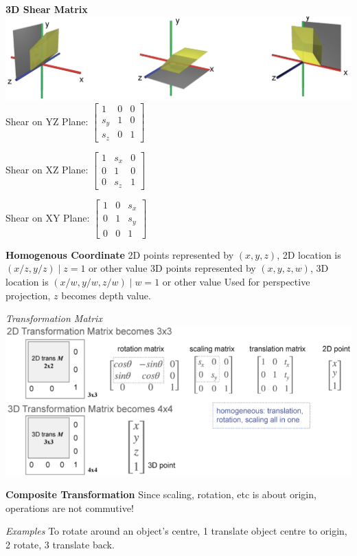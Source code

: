 \documentclass[letterpaper, 8pt]{extarticle}
\begin{document}
\begin{multicols*}{4}
\textbf{3D Shear Matrix}
\includegraphics[width=\linewidth]{3d-shear.png}
Shear on YZ Plane:
\(
\begin{bmatrix}
    1 & 0 & 0 \\
    s_y & 1 & 0 \\
    s_z & 0 & 1
\end{bmatrix}
\)

Shear on XZ Plane:
\(
\begin{bmatrix}
    1 & s_x & 0 \\
    0 & 1 & 0 \\
    0 & s_z & 1
\end{bmatrix}
\)

Shear on XY Plane:
\(
\begin{bmatrix}
    1 & 0 & s_x \\
    0 & 1 & s_y \\
    0 & 0 & 1
\end{bmatrix}
\)

\textbf{Homogenous Coordinate}
2D points represented by \((x, y, z)\), 2D location is \((x/z, y/z) \mid z=1\) or other value
3D points represented by \((x, y, z, w)\), 3D location is \((x/w, y/w, z/w) \mid w=1\) or other value
Used for perspective projection, \(z\) becomes depth value.

\textit{Transformation Matrix}
\includegraphics[width=\linewidth]{homogenous-coord-transformation-matrix.png}

\textbf{Composite Transformation}
Since scaling, rotation, etc is about origin, operations are not commutive!

\textit{Examples}
To rotate around an object's centre, 1 translate object centre to origin, 2 rotate, 3 translate back.


\end{multicols*}
\end{document}
